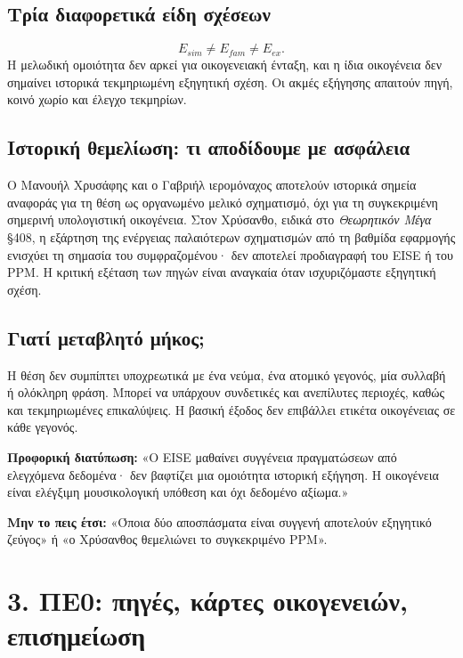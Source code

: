 \documentclass[9pt,a4paper]{extarticle}
\newcommand{\say}[1]{\begin{keybox}\textbf{Προφορική διατύπωση:} #1\end{keybox}}
\newcommand{\avoid}[1]{\begin{redline}\textbf{Μην το πεις έτσι:} #1\end{redline}}
\begin{document}
\subsection*{Τρία διαφορετικά είδη σχέσεων}
\[E_{sim}\neq E_{fam}\neq E_{ex}.\]
Η μελωδική ομοιότητα δεν αρκεί για οικογενειακή ένταξη, και η ίδια οικογένεια δεν σημαίνει ιστορικά τεκμηριωμένη εξηγητική σχέση. Οι ακμές εξήγησης απαιτούν πηγή, κοινό χωρίο και έλεγχο τεκμηρίων.

\subsection*{Ιστορική θεμελίωση: τι αποδίδουμε με ασφάλεια}
Ο Μανουήλ Χρυσάφης και ο Γαβριήλ ιερομόναχος αποτελούν ιστορικά σημεία αναφοράς για τη θέση ως οργανωμένο μελικό σχηματισμό, όχι για τη συγκεκριμένη σημερινή υπολογιστική οικογένεια. Στον Χρύσανθο, ειδικά στο \emph{Θεωρητικόν Μέγα} §408, η εξάρτηση της ενέργειας παλαιότερων σχηματισμών από τη βαθμίδα εφαρμογής ενισχύει τη σημασία του συμφραζομένου· δεν αποτελεί προδιαγραφή του EISE ή του PPM. Η κριτική εξέταση των πηγών είναι αναγκαία όταν ισχυριζόμαστε εξηγητική σχέση.

\subsection*{Γιατί μεταβλητό μήκος;}
Η θέση δεν συμπίπτει υποχρεωτικά με ένα νεύμα, ένα ατομικό γεγονός, μία συλλαβή ή ολόκληρη φράση. Μπορεί να υπάρχουν συνδετικές και ανεπίλυτες περιοχές, καθώς και τεκμηριωμένες επικαλύψεις. Η βασική έξοδος δεν επιβάλλει ετικέτα οικογένειας σε κάθε γεγονός.

\say{«Ο EISE μαθαίνει συγγένεια πραγματώσεων από ελεγχόμενα δεδομένα· δεν βαφτίζει μια ομοιότητα ιστορική εξήγηση. Η οικογένεια είναι ελέγξιμη μουσικολογική υπόθεση και όχι δεδομένο αξίωμα.»}
\avoid{«Όποια δύο αποσπάσματα είναι συγγενή αποτελούν εξηγητικό ζεύγος» ή «ο Χρύσανθος θεμελιώνει το συγκεκριμένο PPM».}
\newpage
\section*{3. ΠΕ0: πηγές, κάρτες οικογενειών, επισημείωση}
\end{document}
